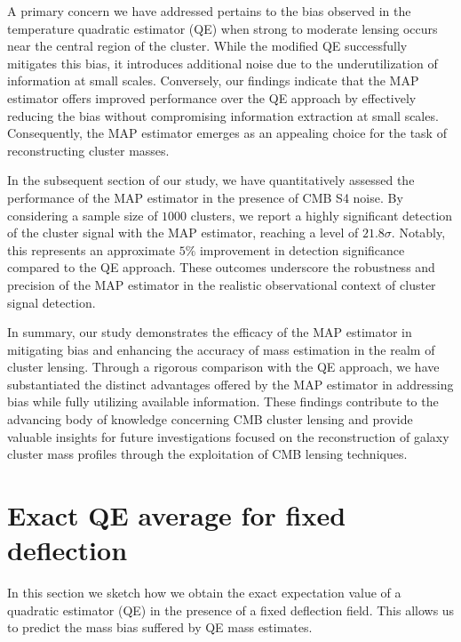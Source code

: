 \documentclass[prd, superscriptaddress, tightenlines, longbibliography, nofootinbib, eqsecnum, amsfonts, amsmath, floatfix, twocolumn, notitlepage]{revtex4-2}
\begin{document}
A primary concern we have addressed pertains to the bias observed in the temperature quadratic estimator (QE) when strong to moderate lensing occurs near the central region of the cluster. While the modified QE successfully mitigates this bias, it introduces additional noise due to the underutilization of information at small scales. Conversely, our findings indicate that the MAP estimator offers improved performance over the QE approach by effectively reducing the bias without compromising information extraction at small scales. Consequently, the MAP estimator emerges as an appealing choice for the task of reconstructing cluster masses.

In the subsequent section of our study, we have quantitatively assessed the performance of the MAP estimator in the presence of CMB S4 noise. By considering a sample size of $1000$ clusters, we report a highly significant detection of the cluster signal with the MAP estimator, reaching a level of $21.8\sigma$. Notably, this represents an approximate $5\%$ improvement in detection significance compared to the QE approach. These outcomes underscore the robustness and precision of the MAP estimator in the realistic observational context of cluster signal detection.

In summary, our study demonstrates the efficacy of the MAP estimator in mitigating bias and enhancing the accuracy of mass estimation in the realm of cluster lensing. Through a rigorous comparison with the QE approach, we have substantiated the distinct advantages offered by the MAP estimator in addressing bias while fully utilizing available information. These findings contribute to the advancing body of knowledge concerning CMB cluster lensing and provide valuable insights for future investigations focused on the reconstruction of galaxy cluster mass profiles through the exploitation of CMB lensing techniques.


\begin{acknowledgements}

\end{acknowledgements}

\appendix
\section{Exact QE average for fixed deflection}\label{A1}
\newcommand{\hn}[0]{\hat n}
In this section we sketch how we obtain the exact expectation value of a quadratic estimator (QE) in the presence of a fixed deflection field. This allows us to predict the mass bias suffered by QE mass estimates.
\end{document}

